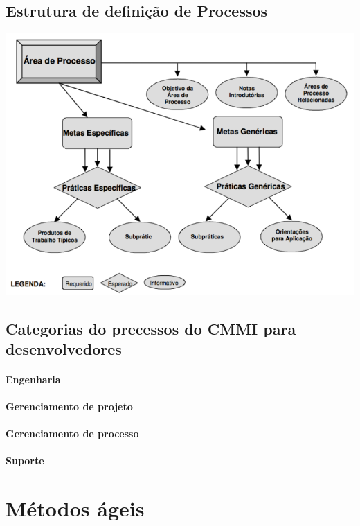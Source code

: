 \documentclass{article}
\begin{document}
\subsection{Estrutura de definição de Processos}
	\begin{center}
		\includegraphics[scale=0.5]{estrutura_definicao_cmmi}
	\end{center}

\subsection{Categorias do precessos do CMMI para desenvolvedores}

\paragraph{Engenharia}
\paragraph{Gerenciamento de projeto}
\paragraph{Gerenciamento de processo}
\paragraph{Suporte}

\section{Métodos ágeis} \date{7 de Abril de 2014}
\end{document}
